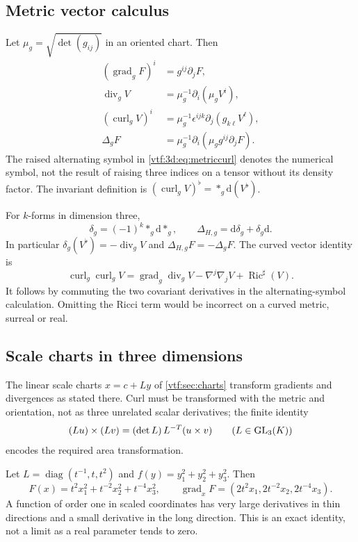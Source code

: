 \documentclass[11pt,letterpaper]{article}
\theoremstyle{definition}
\theoremstyle{remark}
\newcommand{\Ric}{\operatorname{Ric}}\newcommand{\Scal}{\operatorname{Scal}}
\newcommand{\grad}{\operatorname{grad}}\newcommand{\Div}{\operatorname{div}}
\newcommand{\curl}{\operatorname{curl}}
\newcommand{\dd}{\mathrm d}
\begin{document}
\subsection{Metric vector calculus}
Let $\mu_g=\sqrt{\det(g_{ij})}$ in an oriented chart. Then
\begin{align}
 (\grad_gF)^i&=g^{ij}\partial_jF,\\
 \Div_gV&=\mu_g^{-1}\partial_i(\mu_gV^i),\label{vtf:3d:eq:metricdiv}\\
 (\curl_gV)^i&=\mu_g^{-1}\epsilon^{ijk}\partial_j(g_{k\ell}V^\ell),\label{vtf:3d:eq:metriccurl}\\
 \Delta_gF&=\mu_g^{-1}\partial_i(\mu_gg^{ij}\partial_jF).
\end{align}
The raised alternating symbol in \eqref{vtf:3d:eq:metriccurl} denotes the numerical symbol, not the result of raising three indices on a tensor without its density factor. The invariant definition is
$(\curl_gV)^\flat=*_{g}\dd(V^\flat)$.

For $k$-forms in dimension three,
\[
 \delta_g=(-1)^k*_{g}\dd*_{g},\qquad
 \Delta_{H,g}=\dd\delta_g+\delta_g\dd.
\]
In particular $\delta_g(V^\flat)=-\Div_gV$ and $\Delta_{H,g}F=-\Delta_gF$.
The curved vector identity is
\begin{equation}\label{vtf:3d:eq:curvedcurl}
 \curl_g\curl_gV
 =\grad_g\Div_gV-\nabla^j\nabla_jV+\Ric^\sharp(V).
\end{equation}
It follows by commuting the two covariant derivatives in the alternating-symbol calculation. Omitting the Ricci term would be incorrect on a curved metric, surreal or real.

\subsection{Scale charts in three dimensions}

The linear scale charts $x=c+Ly$ of \cref{vtf:sec:charts} transform gradients
and divergences as stated there. Curl must be transformed with the metric and
orientation, not as three unrelated scalar derivatives; the finite identity
\begin{equation}\label{vtf:3d:eq:crossL}
 (Lu)\times(Lv)=(\det L)\,L^{-T}(u\times v)\qquad(L\in\operatorname{GL}_3(K))
\end{equation}
encodes the required area transformation.

Let $L=\operatorname{diag}(t^{-1},t,t^2)$ and $f(y)=y_1^2+y_2^2+y_3^2$. Then
\[
 F(x)=t^2x_1^2+t^{-2}x_2^2+t^{-4}x_3^2,
 \qquad \grad_xF=(2t^2x_1,2t^{-2}x_2,2t^{-4}x_3).
\]
A function of order one in scaled coordinates has very large derivatives in thin directions and a small derivative in the long direction. This is an exact identity, not a limit as a real parameter tends to zero.
\end{document}
